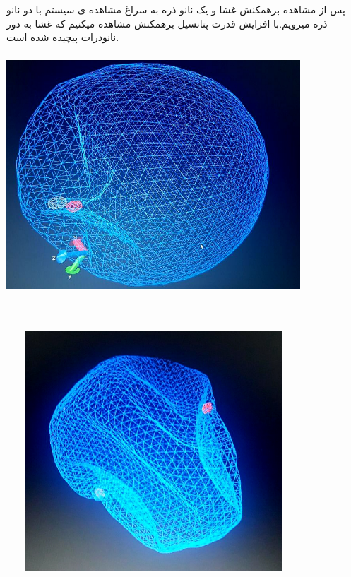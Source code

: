 \documentclass[12pt,onecolumn,a4paper]{report}
\begin{document}
پس از مشاهده برهمکنش غشا و یک نانو ذره به سراغ مشاهده ی سیستم با دو نانو ذره میرویم.با افزایش قدرت پتانسیل برهمکنش مشاهده میکنیم که غشا به 
دور نانوذرات پیچیده شده است.
\begin{center}
\includegraphics[width=11cm, height=9cm]{20210213_204324.jpg}
\end{center}\\




\begin{center}
\includegraphics[width=11cm, height=9cm]{20210213_204232.jpg}
\end{center}\\
\end{document}
